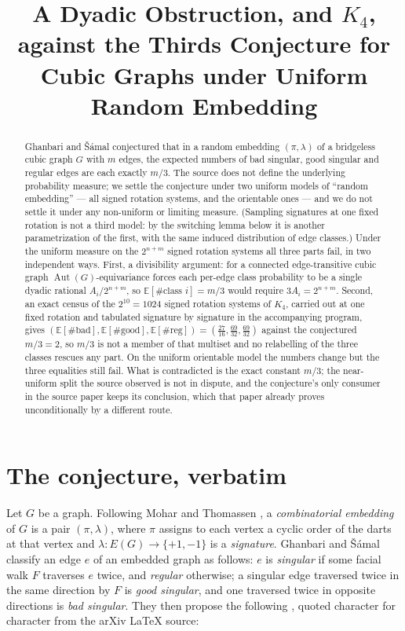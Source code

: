 \documentclass[11pt]{amsart}
\title[A dyadic obstruction, and $K_4$, against the thirds conjecture]
{A Dyadic Obstruction, and $K_4$, against the Thirds Conjecture for Cubic
Graphs under Uniform Random Embedding}
\date{}
\DeclareMathOperator{\Aut}{Aut}
\begin{document}
\begin{abstract}
Ghanbari and \v{S}\'{a}mal conjectured that in a random embedding
$(\pi,\lambda)$ of a bridgeless cubic graph $G$ with $m$ edges, the expected
numbers of bad singular, good singular and regular edges are each exactly
$m/3$. The source does not define the underlying probability measure; we settle
the conjecture under two uniform models of ``random embedding'' --- all signed
rotation systems, and the orientable ones --- and we do not settle it under any
non-uniform or limiting measure. (Sampling signatures at one fixed rotation is
not a third model: by the switching lemma below it is another parametrization of
the first, with the same induced distribution of edge classes.) Under the uniform
measure on the $2^{n+m}$ signed rotation systems all three parts fail, in two
independent ways. First, a divisibility
argument: for a connected edge-transitive cubic graph $\Aut(G)$-equivariance
forces each per-edge class probability to be a single dyadic rational
$A_i/2^{n+m}$, so $\mathbb{E}[\#\text{class }i]=m/3$ would require
$3A_i=2^{n+m}$. Second, an exact census of the $2^{10}=1024$ signed rotation
systems of $K_4$, carried out at one fixed rotation and tabulated
signature by signature in the accompanying program, gives
$(\mathbb{E}[\#\mathrm{bad}],\mathbb{E}[\#\mathrm{good}],\mathbb{E}[\#\mathrm{reg}])
=(\tfrac{27}{16},\tfrac{69}{32},\tfrac{69}{32})$
against the conjectured $m/3=2$, so $m/3$ is not a member of that
multiset and no relabelling of the three classes rescues any part. On the
uniform orientable model the numbers change but the three equalities still
fail. What is contradicted is the exact constant $m/3$; the near-uniform split the
source observed is not in dispute, and the conjecture's only consumer in the
source paper keeps its conclusion, which that paper already proves
unconditionally by a different route.
\end{abstract}

\maketitle

\section{The conjecture, verbatim}

Let $G$ be a graph. Following Mohar and Thomassen \cite{MT}, a
\emph{combinatorial embedding} of $G$ is a pair $(\pi,\lambda)$, where $\pi$
assigns to each vertex a cyclic order of the darts at that vertex and
$\lambda:E(G)\to\{+1,-1\}$ is a \emph{signature}. Ghanbari and \v{S}\'{a}mal
\cite[lines 117--120 of \texttt{main.tex}]{GS} classify an edge $e$ of an
embedded graph as follows: $e$ is \emph{singular} if some facial walk $F$
traverses $e$ twice, and \emph{regular} otherwise; a singular edge traversed
twice in the same direction by $F$ is \emph{good singular}, and one traversed
twice in opposite directions is \emph{bad singular}. They then propose the
following \cite[Conjecture~1, \texttt{main.tex} lines 306--313]{GS}, quoted
character for character from the arXiv \LaTeX{} source:
\end{document}
